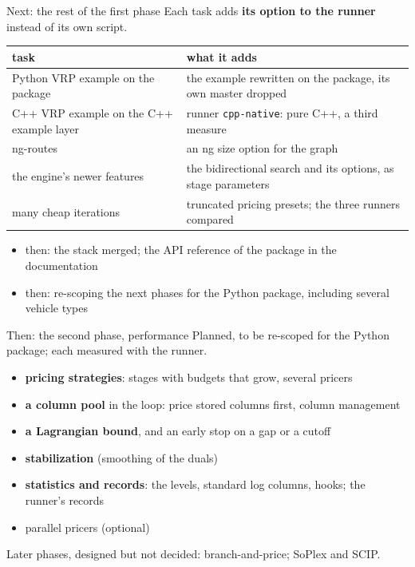 \documentclass[aspectratio=169]{beamer}
\begin{document}
\begin{frame}{Next: the rest of the first phase}
  Each task adds \textbf{its option to the runner} instead of its own script.

  \vspace{0.4em}
  \small
  \begin{tabular}{@{}>{\raggedright\arraybackslash}p{}>{\raggedright\arraybackslash}p{}@{}}
    \toprule
    task & what it adds \\
    \midrule
    Python VRP example on the package & the example rewritten on the package, its own master dropped \\
    C++ VRP example on the C++ example layer & runner \texttt{cpp-native}: pure C++, a third measure \\
    ng-routes & an ng size option for the graph \\
    the engine's newer features & the bidirectional search and its options, as stage parameters \\
    many cheap iterations & truncated pricing presets; the three runners compared \\
    \bottomrule
  \end{tabular}

  \vspace{0.6em}
  \begin{itemize}\small
    \item then: the stack merged; the API reference of the package in the documentation
    \item then: re-scoping the next phases for the Python package, including several vehicle types
  \end{itemize}
\end{frame}

\begin{frame}{Then: the second phase, performance}
  Planned, to be re-scoped for the Python package; each measured with the runner.
  \begin{itemize}\small
    \item \textbf{pricing strategies}: stages with budgets that grow, several pricers
    \item \textbf{a column pool} in the loop: price stored columns first, column management
    \item \textbf{a Lagrangian bound}, and an early stop on a gap or a cutoff
    \item \textbf{stabilization} (smoothing of the duals)
    \item \textbf{statistics and records}: the levels, standard log columns, hooks; the runner's records
    \item parallel pricers (optional)
  \end{itemize}

  \vspace{0.4em}
  \small\textcolor{GLGray}{Later phases, designed but not decided: branch-and-price; SoPlex and SCIP.}
\end{frame}
\end{document}
